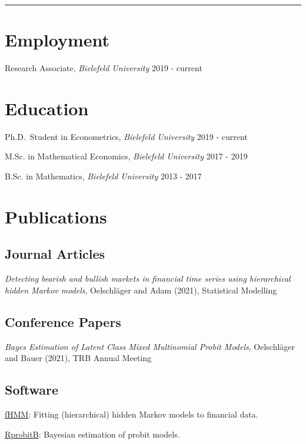 \documentclass[11pt,]{article}
\begin{document}
\vspace{2 mm}
\hrule

\section{Employment}\label{employment}

Research Associate, \emph{Bielefeld University} \hfill 2019 - current

\section{Education}\label{education}

Ph.D.~Student in Econometrics, \emph{Bielefeld University} \hfill 2019 -
current

M.Sc. in Mathematical Economics, \emph{Bielefeld University} \hfill 2017
- 2019

B.Sc. in Mathematics, \emph{Bielefeld University} \hfill 2013 - 2017

\section{Publications}\label{publications}

\subsection{Journal Articles}\label{journal-articles}

\emph{Detecting bearish and bullish markets in financial time series
using hierarchical hidden Markov models}, Oelschläger and Adam (2021),
Statistical Modelling

\subsection{Conference Papers}\label{conference-papers}

\emph{Bayes Estimation of Latent Class Mixed Multinomial Probit Models},
Oelschläger and Bauer (2021), TRB Annual Meeting

\subsection{Software}\label{software}

\href{https://loelschlaeger.de/fHMM/}{fHMM}: Fitting (hierarchical)
hidden Markov models to financial data.

\href{https://loelschlaeger.de/RprobitB/}{RprobitB}: Bayesian estimation
of probit models.
\end{document}
